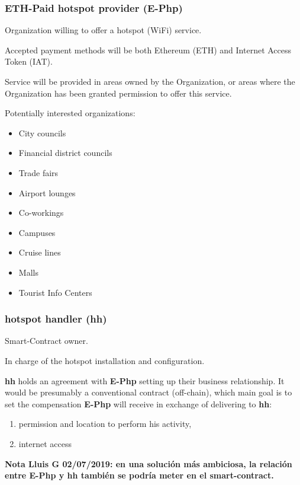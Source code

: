 \documentclass[12pt]{report}
\begin{document}
  \subsubsection{ETH-Paid hotspot provider (E-Php)}

  Organization willing to offer a hotspot (WiFi) service.

  Accepted payment methods will be both Ethereum (ETH) and Internet Access Token (IAT).

  Service will be provided in areas owned by the Organization, or areas where the Organization has been granted permission to offer this service.

  Potentially interested organizations:

  \begin{itemize}
    \item City councils
    \item Financial district councils
    \item Trade fairs
    \item Airport lounges
    \item Co-workings
    \item Campuses
    \item Cruise lines
    \item Malls
    \item Tourist Info Centers
  \end{itemize}

  \subsubsection{hotspot handler (hh)}

  Smart-Contract owner.

  In charge of the hotspot installation and configuration.

  \textbf{hh} holds an agreement with \textbf{E-Php} setting up their business
  relationship. It would be presumably a conventional contract
  (off-chain), which main goal is to set the compensation \textbf{E-Php} will
  receive in exchange of delivering to \textbf{hh}:

  \begin{enumerate}
    \item permission and location to perform his activity,
    \item internet access
  \end{enumerate}

  \textbf{Nota Lluis G 02/07/2019: en una solución más ambiciosa, la relación entre E-Php y hh también se podría meter en el smart-contract.}
\end{document}
